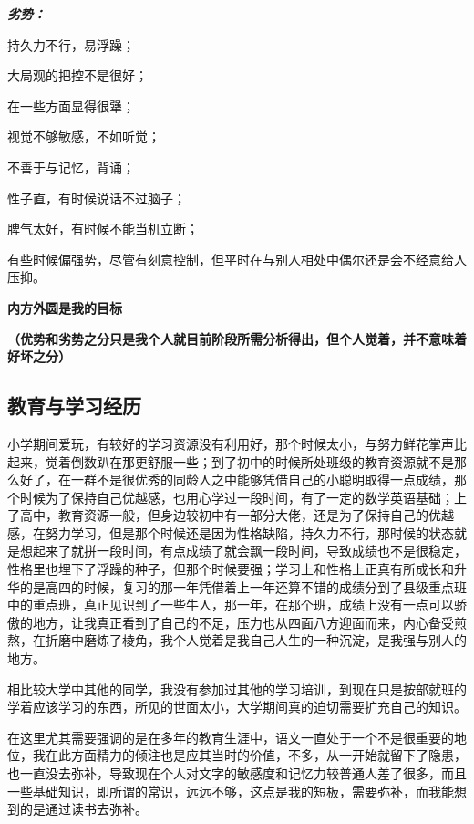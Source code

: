 \documentclass{article}
\begin{document}
\textbf{\textit{劣势：}}\par
持久力不行，易浮躁；\par
大局观的把控不是很好；\par
在一些方面显得很犟；\par
视觉不够敏感，不如听觉；\par 
不善于与记忆，背诵；\par
性子直，有时候说话不过脑子；\par
脾气太好，有时候不能当机立断；\par
有些时候偏强势，尽管有刻意控制，但平时在与别人相处中偶尔还是会不经意给人压抑。\par

\textbf{内方外圆是我的目标}\par
\textbf{（优势和劣势之分只是我个人就目前阶段所需分析得出，但个人觉着，并不意味着好坏之分）}

\subsection{教育与学习经历}
小学期间爱玩，有较好的学习资源没有利用好，那个时候太小，与努力鲜花掌声比起来，觉着倒数趴在那更舒服一些；到了初中的时候所处班级的教育资源就不是那么好了，在一群不是很优秀的同龄人之中能够凭借自己的小聪明取得一点成绩，那个时候为了保持自己优越感，也用心学过一段时间，有了一定的数学英语基础；上了高中，教育资源一般，但身边较初中有一部分大佬，还是为了保持自己的优越感，在努力学习，但是那个时候还是因为性格缺陷，持久力不行，那时候的状态就是想起来了就拼一段时间，有点成绩了就会飘一段时间，导致成绩也不是很稳定，性格里也埋下了浮躁的种子，但那个时候要强；学习上和性格上正真有所成长和升华的是高四的时候，复习的那一年凭借着上一年还算不错的成绩分到了县级重点班中的重点班，真正见识到了一些牛人，那一年，在那个班，成绩上没有一点可以骄傲的地方，让我真正看到了自己的不足，压力也从四面八方迎面而来，内心备受煎熬，在折磨中磨炼了棱角，我个人觉着是我自己人生的一种沉淀，是我强与别人的地方。\par
相比较大学中其他的同学，我没有参加过其他的学习培训，到现在只是按部就班的学着应该学习的东西，所见的世面太小，大学期间真的迫切需要扩充自己的知识。\par
在这里尤其需要强调的是在多年的教育生涯中，语文一直处于一个不是很重要的地位，我在此方面精力的倾注也是应其当时的价值，不多，从一开始就留下了隐患，也一直没去弥补，导致现在个人对文字的敏感度和记忆力较普通人差了很多，而且一些基础知识，即所谓的常识，远远不够，这点是我的短板，需要弥补，而我能想到的是通过读书去弥补。\par
\end{document}
